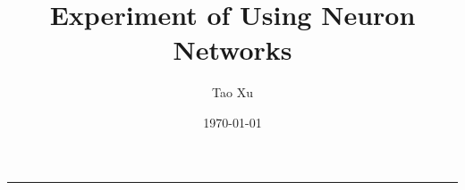 \documentclass[12pt]{article}
\title{Experiment of Using Neuron Networks }
\author{Tao Xu}
\date{\today}
\theoremstyle{remark}
\newcommand{\Rule}{\rule{\linewidth}{0.5pt}}
\begin{document}
	\maketitle
	\tableofcontents
	

	\Rule

	\newpage




	
	\printbibliography
	
	\newpage

\end{document}
